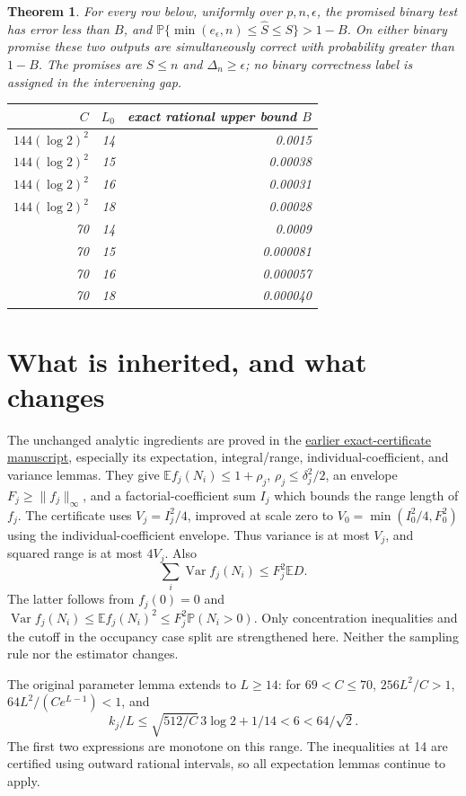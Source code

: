 \documentclass[10pt]{article}
\newtheorem{theorem}{Theorem}
\newcommand{\E}{\mathbb E}
\newcommand{\Prb}{\mathbb P}
\newcommand{\Var}{\operatorname{Var}}
\begin{document}
\begin{theorem}
For every row below, uniformly over $p,n,\epsilon$, the promised binary test
has error less than $B$, and
$\Prb\{\min(e_\epsilon,n)\le\widehat S\le S\}>1-B$.
On either binary promise these two outputs are simultaneously correct with
probability greater than $1-B$.
The promises are $S\le n$ and $\Delta_n\ge\epsilon$; no binary correctness
label is assigned in the intervening gap.
\begin{center}
\begin{tabular}{rrr}
\toprule $C$&$L_0$&exact rational upper bound $B$\\\midrule
$144(\log2)^2$&14&0.0015\\
$144(\log2)^2$&15&0.00038\\
$144(\log2)^2$&16&0.00031\\
$144(\log2)^2$&18&0.00028\\
70&14&0.0009\\70&15&0.000081\\70&16&0.000057\\70&18&0.000040\\
\bottomrule
\end{tabular}
\end{center}
\end{theorem}

\section{What is inherited, and what changes}
The unchanged analytic ingredients are proved in the
\href{../artifacts/joint_constants_submission/submission_proof.pdf}{earlier exact-certificate manuscript},
especially its expectation, integral/range, individual-coefficient, and
variance lemmas. They give $\E f_j(N_i)\le1+\rho_j$,
$\rho_j\le\delta_j^2/2$, an envelope $F_j\ge\|f_j\|_\infty$, and
a factorial-coefficient sum $I_j$ which bounds the range length of $f_j$.
The certificate uses $V_j=I_j^2/4$, improved at scale zero to
$V_0=\min(I_0^2/4,F_0^2)$ using the individual-coefficient envelope.
Thus variance is at most $V_j$, and squared range is at most $4V_j$. Also
\[
 \sum_i\Var f_j(N_i)\le F_j^2\E D.
\]
The latter follows from $f_j(0)=0$ and
$\Var f_j(N_i)\le\E f_j(N_i)^2\le F_j^2\Prb(N_i>0)$.
Only concentration inequalities and the cutoff in the occupancy case split
are strengthened here. Neither the sampling rule nor the estimator changes.

The original parameter lemma extends to $L\ge14$: for $69<C\le70$,
$256L^2/C>1$, $64L^2/(Ce^{L-1})<1$, and
\[
 k_j/L\le\sqrt{512/C}\,3\log2+1/14<6<64/\sqrt2.
\]
The first two expressions are monotone on this range. The inequalities at
14 are certified using outward rational intervals, so all expectation
lemmas continue to apply.
\end{document}
